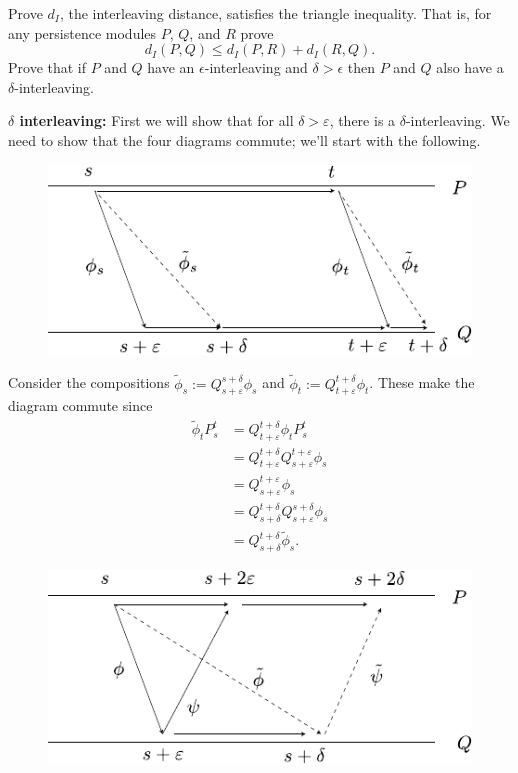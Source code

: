 \documentclass[twoside,10pt]{article}
\begin{document}

\begin{exer}
	Prove $d_I$, the interleaving distance, satisfies the triangle inequality. That is, for any persistence modules $P$, $Q$, and $R$ prove
	\[
	d_I(P, Q) \leq d_I(P, R) + d_I(R, Q).
	\]
	Prove that if $P$ and $Q$ have an $\epsilon$-interleaving and $\delta > \epsilon$ then $P$ and $Q$ also have a $\delta$-interleaving.
\end{exer}

\textbf{$\delta$ interleaving:} First we will show that for all $\delta>\varepsilon$, there is a $\delta$-interleaving. We need to show that the four diagrams commute; we'll start with the following.

\begin{figure}[H]
	\centering
	\includegraphics[scale=1]{fig/1a.pdf}
\end{figure}

Consider the compositions $\tilde{\phi}_s := Q_{s+\varepsilon}^{s+\delta}\phi_s$ and $\tilde{\phi}_t := Q_{t+\varepsilon}^{t+\delta}\phi_t$. These make the diagram commute since
\begin{align*}
	\tilde{\phi}_t P_{s}^{t} &= Q_{t+\varepsilon}^{t+\delta}\phi_t P_{s}^{t} \\
				 &= Q_{t+\varepsilon}^{t+\delta} Q_{s+\varepsilon}^{t+\varepsilon} \phi_s \\
				 &= Q_{s+\varepsilon}^{t+\varepsilon}\phi_s \\
				 &= Q_{s+\delta}^{t+\delta} Q_{s+\varepsilon}^{s+\delta}\phi_s \\
				 &= Q_{s+\delta}^{t+\delta} \tilde{\phi}_s.
\end{align*}

\begin{figure}[H]
	\centering
	\includegraphics[scale=1]{fig/1b.pdf}
\end{figure}
\end{document}
